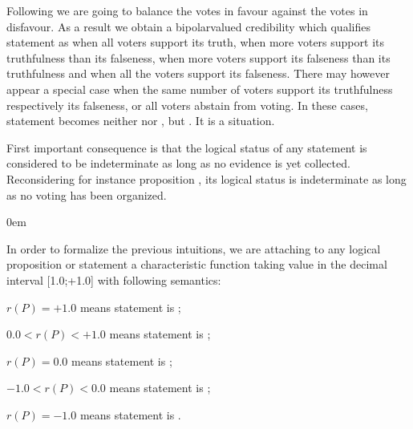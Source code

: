 \documentclass[a4paper,12pt,english]{sphinxhowto}
\begin{document}
\sphinxAtStartPar
Following   we are going to balance the votes in favour against the votes in disfavour. As a result we obtain a bipolar\sphinxhyphen{}valued credibility which qualifies statement  as  when all voters support its truth,  when more voters support its truthfulness than its falseness,  when more voters support its falseness than its truthfulness and  when all the voters support its falseness. There may however appear a special case when the same number of voters support its truthfulness respectively its falseness, or all voters abstain from voting. In these cases, statement  becomes neither  nor , but . It is a  situation.

\sphinxAtStartPar
First important consequence is that the logical status of any statement is considered to be indeterminate as long as no evidence is yet collected. Reconsidering for instance proposition , its logical status is indeterminate as long as no voting has been organized.

\begin{DUlineblock}{0em}
\item[] In order to formalize the previous intuitions, we are attaching to any logical  proposition or statement  a characteristic function  taking value in the decimal interval {[}\sphinxhyphen{}1.0;+1.0{]} with following semantics:
\item[]
\begin{DUlineblock}{\DUlineblockindent}
\item[] \(r(P) = +1.0\) means statement  is ;
\item[] \(0.0 < r(P) < +1.0\) means statement  is ;
\item[] \(r(P) = 0.0\) means statement  is ;
\item[] \(-1.0 < r(P) < 0.0\) means statement  is ;
\item[] \(r(P) = -1.0\) means statement  is .
\end{DUlineblock}
\end{DUlineblock}
\end{document}
